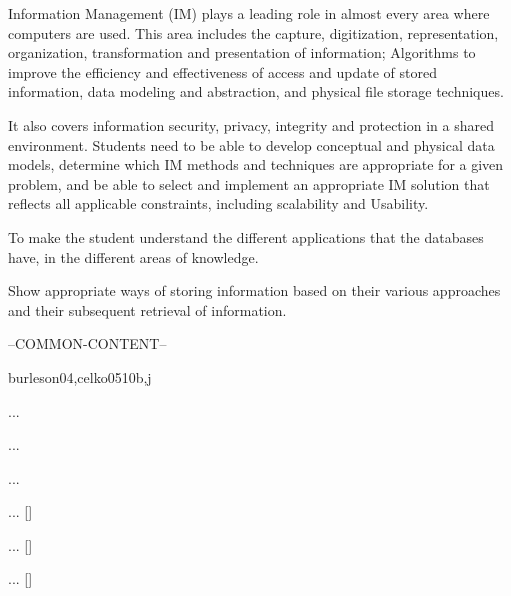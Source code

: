 \begin{syllabus}

	
	\begin{justification}
	Information Management (IM) plays a leading role in almost every area where computers are used. This area includes the capture, digitization, representation, organization, transformation and presentation of information; Algorithms to improve the efficiency and effectiveness of access and update of stored information, data modeling and abstraction, and physical file storage techniques.
	
	It also covers information security, privacy, integrity and protection in a shared environment. Students need to be able to develop conceptual and physical data models, determine which IM methods and techniques are appropriate for a given problem, and be able to select and implement an appropriate IM solution that reflects all applicable constraints, including scalability and Usability.
	\end{justification}
	
	\begin{goals}
	\item To make the student understand the different applications that the databases have, in the different areas of knowledge.
	\item Show appropriate ways of storing information based on their various approaches and their subsequent retrieval of information.
	\end{goals}
	
	--COMMON-CONTENT--
	
	\begin{unit}{\IMPhysicalDatabaseDesign}{}{burleson04,celko05}{10}{b,j}
	\begin{topics}%
		\item ...
		\item ...
		\item ...
	\end{topics}
	\begin{learningoutcomes}
		\item ... [\Usage]
		\item ... [\Usage]
		\item ... [\Usage]
	\end{learningoutcomes}
	\end{unit}
	
	\begin{coursebibliography}
	\end{coursebibliography}
	
	\end{syllabus}
	